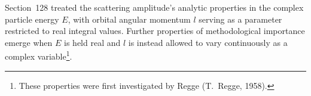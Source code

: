 Section~128 treated the scattering amplitude's analytic properties in the complex particle energy $E$, with orbital angular momentum $l$ serving as a parameter restricted to real integral values. Further properties of methodological importance emerge when $E$ is held real and $l$ is instead allowed to vary continuously as a complex variable\footnote{These properties were first investigated by Regge (T.~Regge, 1958).}.

